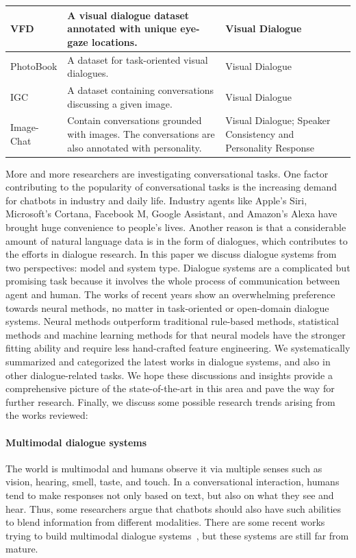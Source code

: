 \begin{longtable}{>{\centering\arraybackslash}y{2.5cm} y{5cm} >{\centering\arraybackslash}y{2cm} >{\centering\arraybackslash}y{2.5cm}}
VFD	&	A visual dialogue dataset annotated with unique eye-gaze locations.	&	Visual Dialogue	&	~	 \\\hline
PhotoBook	&	A dataset for task-oriented visual dialogues.	&	Visual Dialogue	&	~	 \\\hline
IGC	&	A dataset containing conversations discussing a given image.	&	Visual Dialogue	&	~	 \\\hline
Image-Chat	&	Contain conversations grounded with images. The conversations are also annotated with personality.	&	Visual Dialogue; Speaker Consistency and Personality Response	&	~	 \\
\hline
\end{longtable}

\label{Conclusions and Trends} 
More and more researchers are investigating conversational tasks. One factor contributing to the popularity of conversational tasks is the increasing demand for chatbots in industry and daily life. Industry agents like Apple's Siri, Microsoft's Cortana, Facebook M, Google Assistant, and Amazon's Alexa have brought huge convenience to people's lives. Another reason is that a considerable amount of natural language data is in the form of dialogues, which contributes to the efforts in dialogue research. 
In this paper we discuss dialogue systems from two perspectives: model and system type. Dialogue systems are a complicated but promising task because it involves the whole process of communication between agent and human. The works of recent years show an overwhelming preference towards neural methods, no matter in task-oriented or open-domain dialogue systems. Neural methods outperform traditional rule-based methods, statistical methods and machine learning methods for that neural models have the stronger fitting ability and require less hand-crafted feature engineering. 
We systematically summarized and categorized the latest works in dialogue systems, and also in other dialogue-related tasks. We hope these discussions and insights provide a comprehensive picture of the state-of-the-art in this area and pave the way for further research. Finally, we discuss some possible research trends arising from the works reviewed: 
\paragraph*{Multimodal dialogue systems} The world is multimodal and humans observe it via multiple senses such as vision, hearing, smell, taste, and touch. In a conversational interaction, humans tend to make responses not only based on text, but also on what they see and hear. Thus, some researchers argue that chatbots should also have such abilities to blend information from different modalities. There are some recent works trying to build multimodal dialogue systems~, but these systems are still far from mature. 
